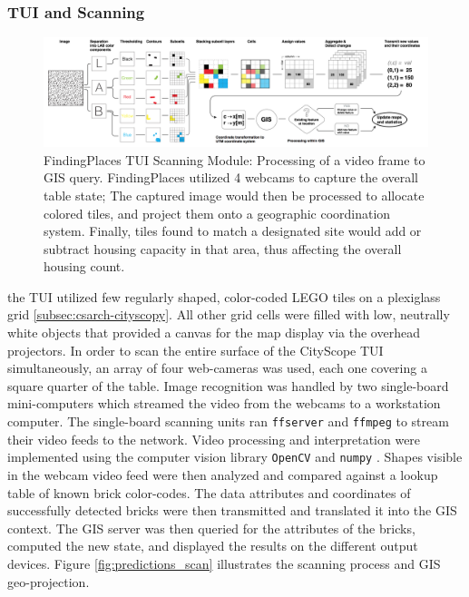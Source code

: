 {{        \subsubsection{TUI and Scanning}
        {

            \begin{figure}[!htb]
                \begin{center}
                    \includegraphics[width=1\textwidth]{chapters/consensus/findingplaces/figures/fp7.png}
                \end{center}
                \caption{FindingPlaces TUI Scanning Module: Processing of a video frame to GIS query. FindingPlaces utilized 4 webcams to capture the overall table state; The captured image would then be processed to allocate colored tiles, and project them onto a geographic coordination system. Finally, tiles found to match a designated site would add or subtract housing capacity in that area, thus affecting the overall housing count.}
                \label{fig:predictions_scan}
            \end{figure}

            the TUI utilized few regularly shaped, color-coded LEGO tiles on a plexiglass grid \eqref{subsec:csarch-cityscopy}. All other grid cells were filled with low, neutrally white objects that provided a canvas for the map display via the overhead projectors. In order to scan the entire surface of the CityScope TUI simultaneously, an array of four web-cameras was used, each one covering a square quarter of the table. Image recognition was handled by two single-board mini-computers which streamed the video from the webcams to a workstation computer. The single-board scanning units ran \texttt{ffserver} and \texttt{ffmpeg} to stream their video feeds to the network. Video processing and interpretation were implemented using the computer vision library \texttt{OpenCV} and \texttt{numpy} \cite{opencv_library}.
            \newline
            Shapes visible in the webcam video feed were then analyzed and compared against a lookup table of known brick color-codes. The data attributes and coordinates of successfully detected bricks were then transmitted and translated it into the GIS context. The GIS server was then queried for the attributes of the bricks, computed the new state, and displayed the results on the different output devices. Figure \eqref{fig:predictions_scan} illustrates the scanning process and GIS geo-projection.
        }

}}

